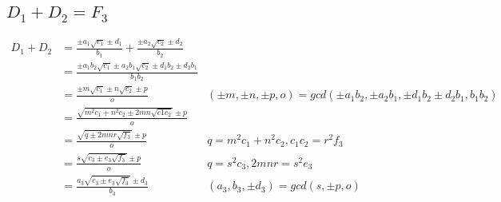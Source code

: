 \documentclass{article}
\begin{document}
\subsection{$D_1 + D_2 = F_3$}
\begin{align*}
D_1 + D_2 &= \frac{\pm a_1\sqrt{c_1} \pm d_1 }{b_1} + \frac{\pm a_2\sqrt{c_2} \pm d_2 }{b_2}\\
 &= \frac{\pm a_1b_2\sqrt{c_1} \pm a_2b_1\sqrt{c_2} \pm d_1b_2 \pm d_2b_1}{b_1b_2} \\
 &= \frac{\pm m\sqrt{c_1} \pm n\sqrt{c_2} \pm p }{o}
     & (\pm m, \pm n, \pm p, o) = gcd(\pm a_1b_2, \pm a_2b_1, \pm d_1b_2 \pm d_2b_1, b_1b_2)\\
 &= \frac{\sqrt{m^2c_1 + n^2c_2 \pm 2mn\sqrt{c1c_2}} \pm p }{o} \\
 &= \frac{\sqrt{q \pm 2mnr\sqrt{f_3}} \pm p}{o}     & q = m^2c_1 + n^2c_2, c_1c_2 = r^2f_3\\
 &= \frac{s\sqrt{c_3 \pm e_3\sqrt{f_3}} \pm p}{o}   & q = s^2c_3, 2mnr = s^2e_3 \\
 &= \frac{a_3\sqrt{c_3 \pm e_3\sqrt{f_3}} \pm d_3}{b_3}
    & (a_3, b_3, \pm d_3) = gcd(s, \pm p, o)
\end{align*}
\end{document}
